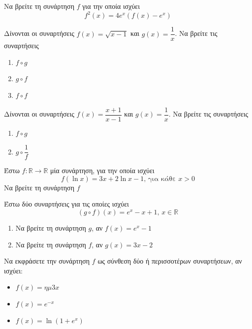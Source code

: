 \documentclass{presentation}
\begin{document}
\begin{askisi}
  Να βρείτε τη συνάρτηση $f$ για την οποία ισχύει
  $$f^2(x)=4e^x\left(f(x)-e^x\right)$$

\end{askisi}

\begin{askisi}
  Δίνονται οι συναρτήσεις $f(x)=\sqrt{x-1}$ και $g(x)=\dfrac{1}{x}$. Να βρείτε τις συναρτήσεις
  \begin{enumerate}
    \item<1-> $f\circ g$
    \item<2-> $g\circ f$
    \item<3-> $f\circ f$
  \end{enumerate}

\end{askisi}

\begin{askisi}
  Δίνονται οι συναρτήσεις $f(x)=\dfrac{x+1}{x-1}$ και $g(x)=\dfrac{1}{x}$. Να βρείτε τις συναρτήσεις
  \begin{enumerate}
    \item<1-> $f\circ g$
    \item<2-> $g\circ \dfrac{1}{f}$
  \end{enumerate}

\end{askisi}

\begin{askisi}
  Έστω $f:\mathbb{R}\to\mathbb{R}$ μία συνάρτηση, για την οποία ισχύει
  $$f(\ln x)=3x+2\ln x -1\text{, για κάθε } x>0$$
  Να βρείτε τη συνάρτηση $f$

\end{askisi}

\begin{askisi}
  Έστω δύο συναρτήσεις για τις οποίες ισχύει
  $$(g\circ f)(x)=e^x-x+1\text{, } x\in\mathbb{R}$$
  \begin{enumerate}
    \item<1-> Να βρείτε τη συνάρτηση $g$, αν $f(x)=e^x-1$
    \item<2-> Να βρείτε τη συνάρτηση $f$, αν $g(x)=3x-2$
  \end{enumerate}

\end{askisi}

\begin{askisi}
  Να εκφράσετε την συνάρτηση $f$ ως σύνθεση δύο ή περισσοτέρων συναρτήσεων, αν ισχύει:
  \begin{itemize}
    \item $f(x)=ημ 3x$
    \item $f(x)=e^{-x}$
    \item $f(x)=\ln (1+e^x)$
  \end{itemize}

\end{askisi}
\end{document}
